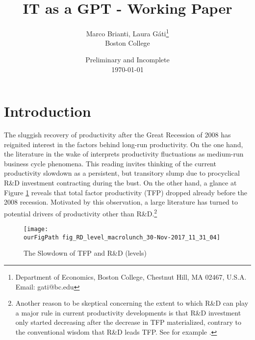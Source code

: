 \documentclass[11pt]{article}
\def \ourFigPath {../../Figures/}
\renewcommand{\[}{\begin{equation}}
\renewcommand{\]}{\end{equation}}
\begin{document}
\linespread{1.0}

\title{IT as a GPT - Working Paper}
\author{Marco Brianti, Laura G\'ati\thanks{%
Department of Economics, Boston College, Chestnut Hill, MA 02467, U.S.A. Email: gati@bc.edu} \\
 Boston College \\
}
\date{Preliminary and Incomplete \\ \today}
\maketitle



\newpage
\section{Introduction}
The sluggish recovery of productivity after the Great Recession of 2008 has reignited interest in the factors behind long-run productivity. On the one hand, the literature in the wake of \cite{comin_gertler2006} interprets productivity fluctuations as medium-run business cycle phenomena. This reading invites thinking of the current productivity slowdown as a persistent, but transitory slump due to procyclical R\&D investment contracting during the bust. On the other hand, a glance at Figure \ref{fig_slowdowns} reveals that total factor productivity (TFP) dropped already before the 2008 recession. Motivated by this observation, a large literature has turned to potential drivers of productivity other than R\&D.\footnote{Another reason to be skeptical concerning the extent to which R\&D can play a major rule in current productivity developments is that R\&D investment only started decreasing after the decrease in TFP materialized, contrary to the conventional wisdom that R\&D leads TFP. See for example \cite{guerron_jinnai2013}.} 

\begin{figure}[h!]
\centering
\caption{The Slowdown of TFP and R\&D (levels)}
\texttt{[image: \\ourFigPath fig\_RD\_level\_macrolunch\_30-Nov-2017\_11\_31\_04]}
\label{fig_slowdowns}
\end{figure}
\end{document}
